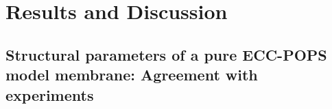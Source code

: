 \documentclass[journal=jpcbfk,manuscript=article]{achemso}
\begin{document}
 






\section{Results and Discussion} 
 
\subsection{Structural parameters of a pure ECC-POPS model membrane: Agreement with experiments} 
 
\end{document}
